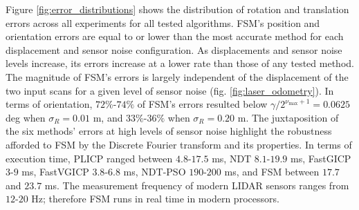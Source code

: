 \begin{figure*}
\begin{framed}
  \vspace{-0.75cm}\hspace{-0.75cm}
    \subfloat{}
    \qquad \hspace{-1.25cm}
    \subfloat{}
    \vspace{-2.5cm}
    \caption{\small Distribution of orientation and position errors across a
             range of maximal positional and orientational displacements, for
             progressively larger sensor measurement noise levels sd. Each
             boxplot represents $10$ iterations over $\sum|D_k| \approx
             45$$\cdot$$10^3$ random scan pairs for each configuration,
             $k=1,\dots,5$. Dots signify mean errors. FSM's errors are largely
             independent of the initial displacement of scans for a given level
             of sensor noise}%
    \label{fig:error_distributions}%
\end{framed}
\end{figure*}

Figure \ref{fig:error_distributions} shows the distribution of rotation and
translation errors across all experiments for all tested algorithms.  FSM's
position and orientation errors are equal to or lower than the most accurate
method for each displacement and sensor noise configuration. As displacements
and sensor noise levels increase, its errors increase at a lower rate than
those of any tested method. The magnitude of FSM's errors is largely
independent of the displacement of the two input scans for a given level of
sensor noise (fig.  \ref{fig:laser_odometry}). In terms of orientation,
$72\%$-$74\%$ of FSM's errors resulted below $\gamma / 2^{\nu_{\max}+1} =
0.0625$ deg when $\sigma_R = 0.01$ m, and $33\%$-$36\%$ when $\sigma_R = 0.20$
m.  The juxtaposition of the six methods' errors at high levels of sensor noise
highlight the robustness afforded to FSM by the Discrete Fourier transform and
its properties.  In terms of execution time, PLICP ranged between $4.8$-$17.5$
ms, NDT $8.1$-$19.9$ ms, FastGICP $3$-$9$ ms, FastVGICP $3.8$-$6.8$ ms, NDT-PSO
$190$-$200$ ms, and FSM between $17.7$ and $23.7$ ms.  The measurement
frequency of modern LIDAR sensors ranges from $12$-$20$ Hz; therefore FSM runs
in real time in modern processors.
